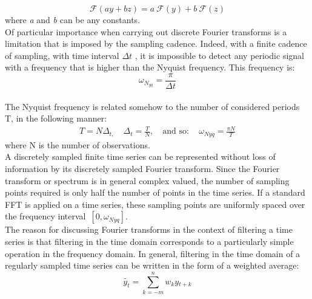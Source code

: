 \documentclass{article}
\begin{document}
\begin{equation}
\mathcal{F}(\textit{a} y + \textit{b} z) = \textit{a} \ \mathcal{F}(y)+ \textit{b} \ \mathcal{F}(z)
\end{equation}
where \textit{a} and \textit{b} can be any constants.\\Of particular importance when carrying out discrete Fourier transforms is a limitation that is imposed by the sampling cadence. Indeed, with a finite cadence of sampling, with time interval $\Delta t$ , it is impossible to detect any periodic signal with a frequency that is higher than the Nyquist frequency. This frequency is:
\begin{equation}
\omega_{N_{yq}} = \frac {\pi}{\Delta t}
\end{equation}\\
The Nyquist frequency is related somehow to the number of considered periods T, in the following manner:
\begin{equation*}
\begin{split}
T=N\Delta_{t,}\quad \Delta_{t}=\frac{T}{N},\quad \text{and so}: \quad \omega_{Nyq}=\frac{\pi N}{T}
\end{split}
\end{equation*}
where N is the number of observations.\\
A discretely sampled finite time series can be represented without loss of information by its discretely sampled Fourier transform. Since the Fourier transform or spectrum is in general complex valued, the number of sampling points required is only half the number of points in the time series. If a standard FFT is applied on a time series, these sampling points are uniformly spaced over the frequency interval\ $[0,\omega_{Nyq}]$.\\The reason for discussing Fourier transforms in the context of filtering a time series is that filtering in the time domain corresponds to a particularly simple operation in the frequency domain. In general, filtering in the time domain of a regularly sampled time series can be written in the form of a weighted average:
\begin{equation}
\tilde {y_t} = \sum\limits_{k=-m}^{n} \textit{w$_k$}\textit{y$_{t+k}$}
\end{equation}
\end{document}

